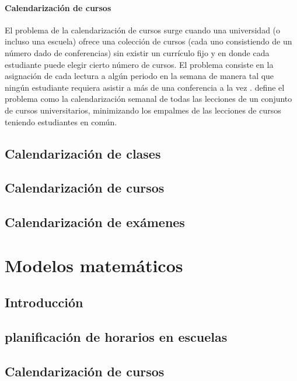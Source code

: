 \documentclass[draft,12pt,headsepline,footsepline,paper=letter]{scrreprt}
\begin{document}
\subsubsection{Calendarización de cursos}

El problema de la calendarización de cursos surge cuando una universidad (o incluso una escuela) ofrece una colección de cursos (cada uno consistiendo de un número dado de conferencias) sin existir un currículo fijo y en donde cada estudiante puede elegir cierto número de cursos. El problema consiste en la asignación de cada lectura a algún periodo en la semana de manera tal que ningún estudiante requiera asistir a más de una conferencia a la vez \citep[p.~157]{werra85an-introduction-to-timetabling}.
\citet[p.~88]{schaerf99a-survey-of-automated} define el problema como la calendarización semanal de todas las lecciones de un conjunto de cursos universitarios, minimizando los empalmes de las lecciones de cursos teniendo estudiantes en común.

\section{Calendarización de clases}
\label{calendarizacion_clases}

\section{Calendarización de cursos}
\label{calendarizacion_cursos}

\section{Calendarización de exámenes}
\label{calendarizacion_examenes}

\chapter{Modelos matemáticos}

\section{Introducción}

\section{planificación de horarios en escuelas}

\section{Calendarización de cursos}
\end{document}
